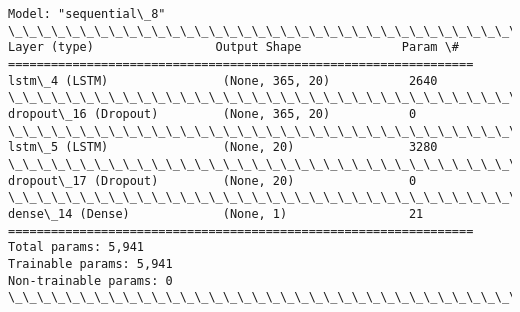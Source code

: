 \documentclass[11pt]{article}
\begin{document}
    \begin{Verbatim}[commandchars=\\\{\}]
Model: "sequential\_8"
\_\_\_\_\_\_\_\_\_\_\_\_\_\_\_\_\_\_\_\_\_\_\_\_\_\_\_\_\_\_\_\_\_\_\_\_\_\_\_\_\_\_\_\_\_\_\_\_\_\_\_\_\_\_\_\_\_\_\_\_\_\_\_\_\_
Layer (type)                 Output Shape              Param \#
=================================================================
lstm\_4 (LSTM)                (None, 365, 20)           2640
\_\_\_\_\_\_\_\_\_\_\_\_\_\_\_\_\_\_\_\_\_\_\_\_\_\_\_\_\_\_\_\_\_\_\_\_\_\_\_\_\_\_\_\_\_\_\_\_\_\_\_\_\_\_\_\_\_\_\_\_\_\_\_\_\_
dropout\_16 (Dropout)         (None, 365, 20)           0
\_\_\_\_\_\_\_\_\_\_\_\_\_\_\_\_\_\_\_\_\_\_\_\_\_\_\_\_\_\_\_\_\_\_\_\_\_\_\_\_\_\_\_\_\_\_\_\_\_\_\_\_\_\_\_\_\_\_\_\_\_\_\_\_\_
lstm\_5 (LSTM)                (None, 20)                3280
\_\_\_\_\_\_\_\_\_\_\_\_\_\_\_\_\_\_\_\_\_\_\_\_\_\_\_\_\_\_\_\_\_\_\_\_\_\_\_\_\_\_\_\_\_\_\_\_\_\_\_\_\_\_\_\_\_\_\_\_\_\_\_\_\_
dropout\_17 (Dropout)         (None, 20)                0
\_\_\_\_\_\_\_\_\_\_\_\_\_\_\_\_\_\_\_\_\_\_\_\_\_\_\_\_\_\_\_\_\_\_\_\_\_\_\_\_\_\_\_\_\_\_\_\_\_\_\_\_\_\_\_\_\_\_\_\_\_\_\_\_\_
dense\_14 (Dense)             (None, 1)                 21
=================================================================
Total params: 5,941
Trainable params: 5,941
Non-trainable params: 0
\_\_\_\_\_\_\_\_\_\_\_\_\_\_\_\_\_\_\_\_\_\_\_\_\_\_\_\_\_\_\_\_\_\_\_\_\_\_\_\_\_\_\_\_\_\_\_\_\_\_\_\_\_\_\_\_\_\_\_\_\_\_\_\_\_
    \end{Verbatim}
\end{document}
